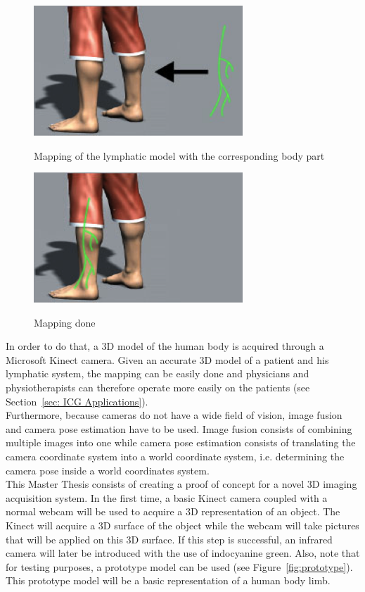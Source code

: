 \begin{figure}[h]
\caption{Mapping of the lymphatic model with the corresponding body part}
\centering
    \includegraphics[width=0.7\textwidth]{images/mapping1.png}
\label{fig:mapping1}
\end{figure}

\begin{figure}[h]
\caption{Mapping done}
\centering
    \includegraphics[width=0.7\textwidth]{images/mapping2.png}
\label{fig:mapping2}
\end{figure}

In order to do that, a 3D model of the human body is acquired through a Microsoft Kinect camera. Given an accurate 3D model of a patient and his lymphatic system, the mapping can be easily done and physicians and physiotherapists can therefore operate more easily on the patients (see Section~\ref{sec: ICG Applications}). \\

Furthermore, because cameras do not have a wide field of vision, image fusion and camera pose estimation have to be used. Image fusion consists of combining multiple images into one while camera pose estimation consists of translating the camera coordinate system into a world coordinate system, i.e. determining the camera pose inside a world coordinates system. \\

This Master Thesis consists of creating a proof of concept for a novel 3D imaging acquisition system. In the first time, a basic Kinect camera coupled with a normal webcam will be used to acquire a 3D representation of an object. The Kinect will acquire a 3D surface of the object while the webcam will take pictures that will be applied on this 3D surface. If this step is successful, an infrared camera will later be introduced with the use of indocyanine green. Also, note that for testing purposes, a prototype model can be used (see Figure~\ref{fig:prototype}). This prototype model will be a basic representation of a human body limb.

